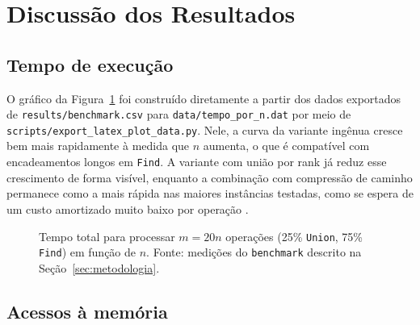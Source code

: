 \section{Discussão dos Resultados}
\label{sec:resultados}

\subsection{Tempo de execução}

O gráfico da Figura~\ref{fig:tempo} foi construído diretamente a partir dos dados exportados de \texttt{results/benchmark.csv} para \texttt{data/tempo\_por\_n.dat} por meio de \texttt{scripts/export\_latex\_plot\_data.py}. Nele, a curva da variante ingênua cresce bem mais rapidamente à medida que $n$ aumenta, o que é compatível com encadeamentos longos em \texttt{Find}. A variante com união por rank já reduz esse crescimento de forma visível, enquanto a combinação com compressão de caminho permanece como a mais rápida nas maiores instâncias testadas, como se espera de um custo amortizado muito baixo por operação \cite{tarjan1975efficiency}.

\begin{figure}[ht]
\centering
{}
\caption{Tempo total para processar $m=20n$ operações (25\% \texttt{Union}, 75\% \texttt{Find}) em função de $n$. Fonte: medições do \texttt{benchmark} descrito na Seção~\ref{sec:metodologia}.}
\label{fig:tempo}
\end{figure}

\subsection{Acessos à memória}

